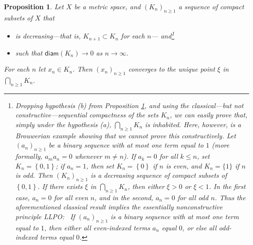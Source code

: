 \documentclass[11pt]{article}%
\newtheorem{proposition}[theorem]{Proposition}
\begin{document}
\begin{proposition}
\label{may04p1}Let $X$ be a metric space, and $\left(  K_{n}\right)
_{n\geqslant1}$ a sequence of compact subsets of $X$ that

\begin{itemize}
\item[\emph{(a)}] is decreasing---that is, $K_{n+1}\subset K_{n}$ for each
$n$--- and\footnote{%
\normalfont\sf
Dropping hypothesis (b) from Proposition \ref{may04p1}, and using the
classical---but not constructive---sequential compactness of the sets $K_{n}$,
we can easily prove that, simply under the hypothesis (a), $%
{\textstyle\bigcap_{n\geq1}}
K_{n}$ is inhabited. Here, however, is a Brouwerian example showing that we
cannot prove this constructively. Let $\left(  a_{n}\right)  _{n\geq1}$ be a
binary sequence with at most one term equal to $1$ (more formally, $a_{m}%
a_{n}=0$ whenever $m\neq n$). If $a_{k}=0$ for all $k\leq n$, set
$K_{n}=\left\{  0,1\right\}  $; if $a_{n}=1$, then set $K_{n}=\left\{
0\right\}  $ if $n$ is even, and $K_{n}=\{1\}$ if $n$ is odd. Then $\left(
K_{n}\right)  _{n\geq1}$ is a decreasing sequence of compact subsets of
$\left\{  0,1\right\}  $. If there exists $\xi$ in $%
{\textstyle\bigcap_{n\geq1}}
K_{n}$, then either $\xi>0$ or $\xi<1$. In the first case, $a_{n}=0$ for all
even $n$, and in the second, $a_{n}=0$ for all odd $n$. Thus the
aforementioned classical result implies the essentially nonconstructive
principle \textsf{LLPO: \ }If $\left(  a_{n}\right)  _{n\geq1}$ is a binary
sequence with at most one term equal to $1$, then either all even-indexed
terms $a_{n}$ equal $0$, or else all odd-indexed terms equal $0$.}

\item[\emph{(b)}] such that $\mathsf{diam}(K_{n})\rightarrow0$ as
$n\rightarrow\infty$.
\end{itemize}

%

\noindent
For each $n$ let $x_{n}\in K_{n}$. Then $\left(  x_{n}\right)  _{n\geqslant1}$
converges to the unique point $\xi$ in $%
{\textstyle\bigcap_{n\geqslant1}}
K_{n}$.
\end{proposition}
\end{document}

